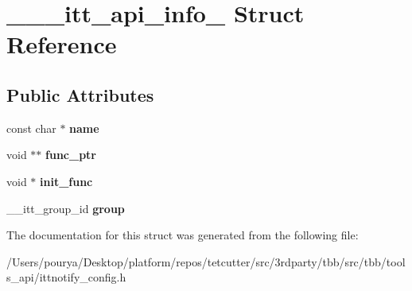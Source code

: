 \hypertarget{struct______itt__api__info__20101001}{}\section{\+\_\+\+\_\+\+\_\+itt\+\_\+api\+\_\+info\+\_ Struct Reference}
\label{struct______itt__api__info__20101001}
\subsection*{Public Attributes}
\begin{DoxyCompactItemize}
\item 
\hypertarget{struct______itt__api__info__20101001_a8e9d10c3041b72e1ea0355b40ee772a5}{}const char $\ast$ {\bfseries name}\label{struct______itt__api__info__20101001_a8e9d10c3041b72e1ea0355b40ee772a5}

\item 
\hypertarget{struct______itt__api__info__20101001_a3055f1f3a553efe6059d674987e0b2e8}{}void $\ast$$\ast$ {\bfseries func\+\_\+ptr}\label{struct______itt__api__info__20101001_a3055f1f3a553efe6059d674987e0b2e8}

\item 
\hypertarget{struct______itt__api__info__20101001_a2c2825ddd464d578ab867e86f83da253}{}void $\ast$ {\bfseries init\+\_\+func}\label{struct______itt__api__info__20101001_a2c2825ddd464d578ab867e86f83da253}

\item 
\hypertarget{struct______itt__api__info__20101001_abd973a098fd9181d23e93fcb2a3de469}{}\+\_\+\+\_\+itt\+\_\+group\+\_\+id {\bfseries group}\label{struct______itt__api__info__20101001_abd973a098fd9181d23e93fcb2a3de469}

\end{DoxyCompactItemize}


The documentation for this struct was generated from the following file\+:\begin{DoxyCompactItemize}
\item 
/\+Users/pourya/\+Desktop/platform/repos/tetcutter/src/3rdparty/tbb/src/tbb/tools\+\_\+api/ittnotify\+\_\+config.\+h\end{DoxyCompactItemize}
